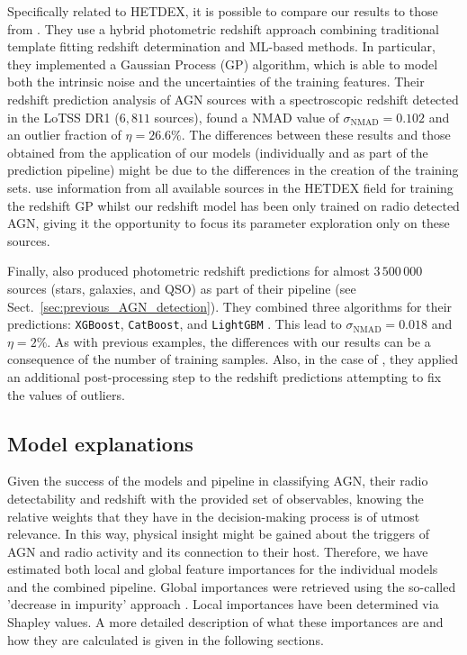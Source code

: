 \documentclass{aa}
\begin{document}
Specifically related to HETDEX, it is possible to compare our results to those from \citet{2019A&A...622A...3D}. They use a hybrid photometric redshift approach combining  traditional template fitting redshift determination and ML-based methods. In particular, they implemented a Gaussian Process (GP) algorithm, which is able to model both the intrinsic noise and the uncertainties of the training features. Their redshift prediction analysis of 
AGN sources with a spectroscopic redshift detected in the LoTSS DR1 ($6,811$ sources),  found a NMAD value of ${\sigma_{\mathrm{NMAD}} = 0.102}$ and an outlier fraction of ${\eta = 26.6 \%}$.
The differences between these results and those obtained from the application of our models (individually and as part of the prediction pipeline) might be due to the differences in the creation of the training sets. \citet{2019A&A...622A...3D} use information from all available sources in the HETDEX field for training the redshift GP whilst our redshift model has been only trained on radio detected AGN, giving it the opportunity to focus its parameter exploration only on these sources.

Finally, \citet{2022arXiv220402080C} also produced photometric redshift predictions for almost $3\,500\,000$ sources (stars, galaxies, and QSO) as part of their pipeline (see Sect.~\ref{sec:previous_AGN_detection}). They combined three algorithms for their predictions: \texttt{XGBoost}, \texttt{CatBoost}, and \texttt{LightGBM} \citep{NIPS2017_6449f44a}. This lead to ${\sigma_{\mathrm{NMAD}} = 0.018}$ and ${\eta = 2 \%}$. As with previous examples, the differences with our results can be a consequence of the number of training samples. Also, in the case of \citet{2022arXiv220402080C}, they applied an additional post-processing step to the redshift predictions attempting to fix the values of outliers.

\subsection{Model explanations}\label{sec:model_explain}

Given the success of the models and pipeline in classifying AGN, their radio detectability and redshift with the provided set of observables, knowing the relative weights that they have in the decision-making process is of utmost relevance. In this way, physical insight might be gained about the triggers of AGN and radio activity and its connection to their host.
Therefore, we have estimated both local and global feature importances for the individual models and the combined pipeline. Global importances were retrieved using the so-called 'decrease in impurity' approach \citep[see, for example,][]{Breiman2001}. Local importances have been determined via Shapley values. A more detailed description of what these importances are and how they are calculated is given in the following sections.
\end{document}
